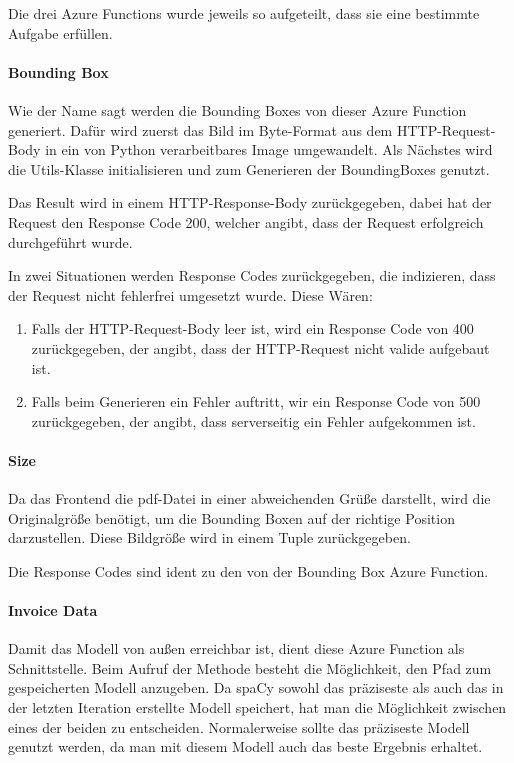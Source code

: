 Die drei Azure Functions wurde jeweils so aufgeteilt, dass sie eine bestimmte Aufgabe erfüllen. 

\paragraph{Bounding Box}

Wie der Name sagt werden die Bounding Boxes von dieser Azure Function generiert. Dafür wird zuerst das Bild im Byte-Format aus dem HTTP-Request-Body in ein von Python verarbeitbares Image umgewandelt. Als Nächstes wird die Utils-Klasse initialisieren und zum Generieren der BoundingBoxes genutzt. 

Das Result wird in einem HTTP-Response-Body zurückgegeben, dabei hat der Request den Response Code 200, welcher angibt, dass der Request erfolgreich durchgeführt wurde. 

In zwei Situationen werden Response Codes zurückgegeben, die in­di­zie­ren, dass der Request nicht fehlerfrei umgesetzt wurde. Diese Wären:

\begin{enumerate}
    \item Falls der HTTP-Request-Body leer ist, wird ein Response Code von 400 zurückgegeben, der angibt, dass der HTTP-Request nicht valide aufgebaut ist.
    \item Falls beim Generieren ein Fehler auftritt, wir ein Response Code von 500 zurückgegeben, der angibt, dass serverseitig ein Fehler aufgekommen ist.
\end{enumerate}

\paragraph{Size}

Da das Frontend die pdf-Datei in einer abweichenden Grüße darstellt, wird die Originalgröße benötigt, um die Bounding Boxen auf der richtige Position darzustellen. Diese Bildgröße wird in einem Tuple zurückgegeben. 

Die Response Codes sind ident zu den von der Bounding Box Azure Function.

\paragraph{Invoice Data} 

Damit das Modell von außen erreichbar ist, dient diese Azure Function als Schnittstelle. Beim Aufruf der Methode besteht die Möglichkeit, den Pfad zum gespeicherten Modell anzugeben. Da spaCy sowohl das präziseste als auch das in der letzten Iteration erstellte Modell speichert, hat man die Möglichkeit zwischen eines der beiden zu entscheiden. Normalerweise sollte das präziseste Modell genutzt werden, da man mit diesem Modell auch das beste Ergebnis erhaltet.

